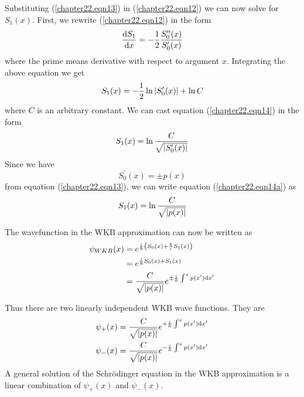 Substituting (\ref{chapter22.eqn13}) in (\ref{chapter22.eqn12}) we can now solve for $S_1(x)$. First, we rewrite (\ref{chapter22.eqn12}) in the form
\begin{equation}
	\dv{S_1}{x} = - \frac{1}{2} \frac{S^{\prime\prime}_0(x)}{S^\prime_0(x)}
\end{equation}
where the prime means derivative with respect to argument $x$. Integrating the above equation we get
\begin{equation}
\label{chapter22.eqn14}
	S_1(x) = - \frac{1}{2} \ln \abs{S^\prime_0(x)} + \ln C
\end{equation}
where $C$ is an arbitrary constant. We can cast equation (\ref{chapter22.eqn14}) in the form
\begin{equation}
\label{chapter22.eqn14a}
	S_1(x) = \ln \frac{C}{\sqrt{\abs{S^\prime_0(x)}}}
\end{equation}
Since we have
\begin{equation}
S^\prime_0(x) = \pm p(x)
\end{equation}
from equation (\ref{chapter22.eqn13}), we can write equation (\ref{chapter22.eqn14a}) as
\begin{equation}
\label{chapter22.eqn15}
	S_1(x) = \ln \frac{C}{\sqrt{\abs{p(x)}}}
\end{equation}

The wavefunction in the WKB approximation can now be written as
\begin{align}
\psi_{WKB}(x) &= e^{\frac{{i\mkern1mu}}{\hbar} \qty(S_0(x) + \frac{\hbar}{{i\mkern1mu}} S_1(x))}  \nonumber\\
&= e^{\frac{{i\mkern1mu}}{\hbar} S_0(x) + S_1(x)} \nonumber\\
\label{chapter22.eqn16}
&= \frac{C}{\sqrt{\abs{p(x)}}} e^{\pm \frac{{i\mkern1mu}}{\hbar}\int^{x} p(x^\prime) \dd{x^\prime}}
\end{align}

Thus there are two linearly independent WKB wave functions. They are
\begin{align}
\label{chapter22.eqn17}
	\psi_+(x) &= \frac{C}{\sqrt{\abs{p(x)}}} e^{+ \frac{{i\mkern1mu}}{\hbar}\int^{x} p(x^\prime) \dd{x^\prime}} \\
\label{chapter22.eqn18}
	\psi_-(x) &= \frac{C}{\sqrt{\abs{p(x)}}} e^{- \frac{{i\mkern1mu}}{\hbar}\int^{x} p(x^\prime) \dd{x^\prime}}
\end{align}
A general solution of the Schr\"{o}dinger equation in the WKB approximation is a linear combination of $\psi_+(x)$ and $\psi_-(x)$.

